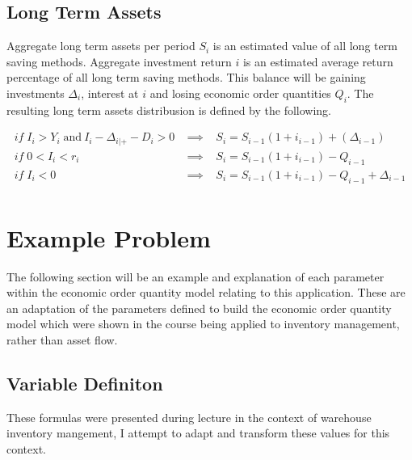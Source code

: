 \documentclass{article}
\begin{document}
\subsection{Long Term Assets}
Aggregate long term assets per period $S_{i}$ is an estimated value of all long term saving methods. Aggregate investment return $i$ is an estimated average return percentage of all long term saving methods.  This balance will be gaining investments $\Delta_{i}$, interest at $i$ and losing economic order quantities $Q_{i}$. The resulting long term assets distribusion is defined by the following. 

\begin{align*}
	if \; I_{i} > Y_{i} \; \text{and} \: I_{i} - \Delta_{i|+} - D_{i} > 0 	& \implies \;\;\; S_{i} = S_{i-1}(1+i_{i-1}) + ( \Delta_{i-1})\\
	if \; 0 < I_{i} < r_{i} 							& \implies \;\;\; S_{i} = S_{i-1}(1+i_{i-1}) - Q_{i-1}\\
	if \; I_{i} < 0  								& \implies \;\;\; S_{i} = S_{i-1}(1+i_{i-1}) - Q_{i-1} +  \Delta_{i-1}\\
\end{align*}

\section{Example Problem}
The following section will be an example and explanation of each parameter within the economic order quantity model relating to this application. These are an adaptation of the parameters defined to build the economic order quantity model which were shown in the course \cite{Askin2019} being applied to inventory management, rather than asset flow.

\subsection{Variable Definiton}  

These formulas were presented during lecture \cite{Askin2019} in the context of warehouse inventory mangement, I attempt to adapt and transform these values for this context. 
\end{document}
